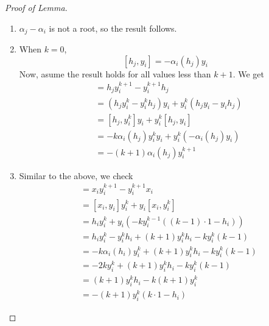 \documentclass[11pt,leqno,oneside]{amsart}
\numberwithin{thm}{section}
\begin{document}
\begin{proof}[Proof of Lemma]
  \begin{enumerate}
  \item \(\alpha_j-\alpha_i\) is not a root, so the result follows.
  \item When \(k = 0\), \[
      [h_j,y_i] = -\alpha_i(h_j)y_i
    \]
    Now, asume the result holds for all values less than \(k+1\). We get
    \begin{align*}
      [h_j,y_i^{k+1}]
      & = h_j y_i^{k+1} - y_i^{k+1} h_j\\
      & = (h_j y_i^k - y_i^k h_j)y_i + y_i^k(h_jy_i-y_ih_j)\\
      & = [h_j, y_i^k] y_i + y_i^k [h_j, y_i] \\
      & = -k \alpha_i(h_j) y_i^k y_i + y_i^k(-\alpha_i(h_j)y_i)\\
      & = -(k+1)\alpha_i(h_j)y_i^{k+1}
    \end{align*}
  \item Similar to the above, we check
    \begin{align*}
      [x_i,y_i^{k+1}]
      & = x_i y_i^{k+1} - y_i^{k+1} x_i\\
      & = [x_i,y_i] y_i^k + y_i[x_i,y_i^k]\\
      & = h_i y_i^k + y_i(-k y_i^{k-1}((k-1)\cdot 1 - h_i)) \\
      & = h_i y_i^k - y_i^k h_i + (k+1)y_i^k h_i - k y_i^k (k-1)\\
      & = -k \alpha_i(h_i)y_i^k + (k+1)y_i^k h_i - k y_i^k (k-1)\\
      & = -2k y_i^k+ (k+1)y_i^k h_i - k y_i^k (k-1)\\
      & = (k+1)y_i^k h_i -k(k+1) y_i^k\\
      & = -(k+1)y_i^k(k \cdot 1 - h_i)
    \end{align*}
  \end{enumerate}
\end{proof}
\end{document}
